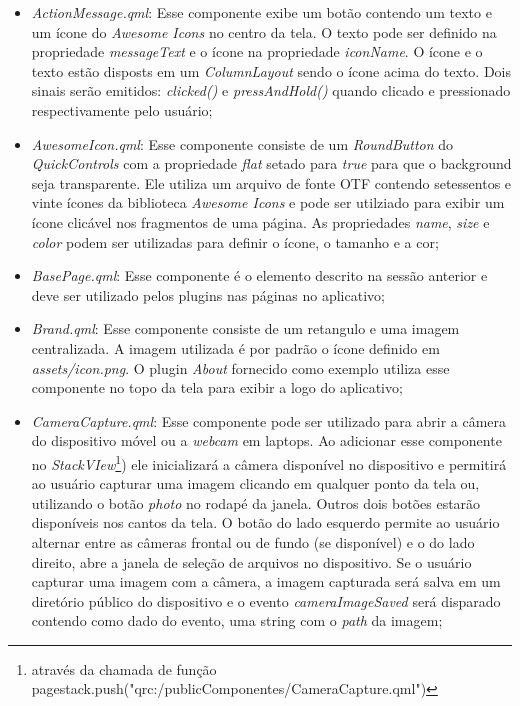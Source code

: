 \begin{itemize}
	\item \textit{ActionMessage.qml}: Esse componente exibe um botão contendo um texto e um ícone do \textit{Awesome Icons} no centro da tela. O texto pode ser definido na propriedade \textit{messageText} e o ícone na propriedade \textit{iconName}. O ícone e o texto estão disposts em um \textit{ColumnLayout} sendo o ícone acima do texto. Dois sinais serão emitidos: \textit{clicked()} e \textit{pressAndHold()} quando clicado e pressionado respectivamente pelo usuário;

	\item \textit{AwesomeIcon.qml}: Esse componente consiste de um \textit{RoundButton} do \textit{QuickControls} com a propriedade \textit{flat} setado para \textit{true} para que o background seja transparente. Ele utiliza um arquivo de fonte OTF contendo setessentos e vinte ícones da biblioteca \textit{Awesome Icons} e pode ser utilziado para exibir um ícone clicável nos fragmentos de uma página. As propriedades \textit{name}, \textit{size} e \textit{color} podem ser utilizadas para definir o ícone, o tamanho e a cor;

	\item \textit{BasePage.qml}: Esse componente é o elemento descrito na sessão anterior e deve ser utilizado pelos plugins nas páginas no aplicativo;

	\item \textit{Brand.qml}: Esse componente consiste de um retangulo e uma imagem centralizada. A imagem utilizada é por padrão o ícone definido em \textit{assets/icon.png}. O plugin \textit{About} fornecido como exemplo utiliza esse componente no topo da tela para exibir a logo do aplicativo;

	\item \textit{CameraCapture.qml}: Esse componente pode ser utilizado para abrir a câmera do dispositivo móvel ou a \textit{webcam} em laptops. Ao adicionar esse componente no \textit{StackVIew}\footnote{através da chamada de função pagestack.push("qrc:/publicComponentes/CameraCapture.qml")}) ele inicializará a câmera disponível no dispositivo e permitirá ao usuário capturar uma imagem clicando em qualquer ponto da tela ou, utilizando o botão \textit{photo} no rodapé da janela. Outros dois botões estarão disponíveis nos cantos da tela. O botão do lado esquerdo permite ao usuário alternar entre as câmeras frontal ou de fundo (se disponível) e o do lado direito, abre a janela de seleção de arquivos no dispositivo. Se o usuário capturar uma imagem com a câmera, a imagem capturada será salva em um diretório público do dispositivo e o evento \textit{cameraImageSaved} será disparado contendo como dado do evento, uma string com o \textit{path} da imagem;


\end{itemize}
